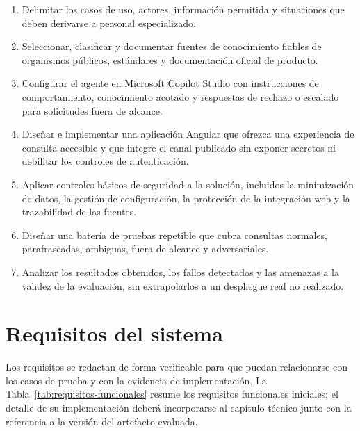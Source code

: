 \begin{enumerate}
  \item Delimitar los casos de uso, actores, información permitida y situaciones
  que deben derivarse a personal especializado.
  \item Seleccionar, clasificar y documentar fuentes de conocimiento fiables de
  organismos públicos, estándares y documentación oficial de producto.
  \item Configurar el agente en Microsoft Copilot Studio con instrucciones de
  comportamiento, conocimiento acotado y respuestas de rechazo o escalado para
  solicitudes fuera de alcance.
  \item Diseñar e implementar una aplicación Angular que ofrezca una experiencia
  de consulta accesible y que integre el canal publicado sin exponer secretos ni
  debilitar los controles de autenticación.
  \item Aplicar controles básicos de seguridad a la solución, incluidos la
  minimización de datos, la gestión de configuración, la protección de la
  integración web y la trazabilidad de las fuentes.
  \item Diseñar una batería de pruebas repetible que cubra consultas normales,
  parafraseadas, ambiguas, fuera de alcance y adversariales.
  \item Analizar los resultados obtenidos, los fallos detectados y las amenazas a
  la validez de la evaluación, sin extrapolarlos a un despliegue real no
  realizado.
\end{enumerate}

\section{Requisitos del sistema}
\label{sec:requisitos}

Los requisitos se redactan de forma verificable para que puedan relacionarse con
los casos de prueba y con la evidencia de implementación. La
Tabla~\ref{tab:requisitos-funcionales} resume los requisitos funcionales
iniciales; el detalle de su implementación deberá incorporarse al capítulo
técnico junto con la referencia a la versión del artefacto evaluada.

